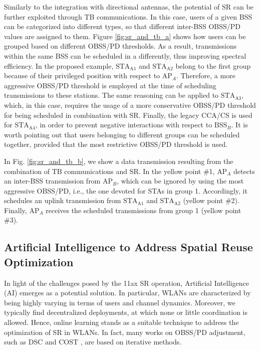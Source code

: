 \documentclass{article}
\begin{document}
Similarly to the integration with directional antennas, the potential of SR can be further exploited through TB communications. In this case, users of a given BSS can be categorized into different types, so that different inter-BSS OBSS/PD values are assigned to them. Figure \ref{fig:sr_and_tb_a} shows how users can be grouped based on different OBSS/PD thresholds. As a result, transmissions within the same BSS can be scheduled in a differently, thus improving spectral efficiency. In the proposed example, $\text{STA}_\text{A1}$ and $\text{STA}_\text{A2}$ belong to the first group because of their privileged position with respect to $\text{AP}_A$. Therefore, a more aggressive OBSS/PD threshold is employed at the time of scheduling transmissions to these stations. The same reasoning can be applied to $\text{STA}_\text{A3}$, which, in this case, requires the usage of a more conservative OBSS/PD threshold for being scheduled in combination with SR. Finally, the legacy CCA/CS is used for $\text{STA}_\text{A4}$, in order to prevent negative interactions with respect to $\text{BSS}_B$. It is worth pointing out that users belonging to different groups can be scheduled together, provided that the most restrictive OBSS/PD threshold is used. 

In Fig. \ref{fig:sr_and_tb_b}, we show a data transmission resulting from the combination of TB communications and SR. In the yellow point \#1, $\text{AP}_A$ detects an inter-BSS transmission from $\text{AP}_B$, which can be ignored by using the most aggressive OBSS/PD, i.e., the one devoted for STAs in group 1. Accordingly, it schedules an uplink transmission from $\text{STA}_\text{A1}$ and $\text{STA}_\text{A2}$ (yellow point \#2). Finally, $\text{AP}_A$ receives the scheduled transmissions from group 1 (yellow point \#3).

\subsection{Artificial Intelligence to Address Spatial Reuse Optimization}
In light of the challenges posed by the 11ax SR operation, Artificial Intelligence (AI) emerges as a potential solution. In particular, WLANs are characterized by being highly varying in terms of users and channel dynamics. Moreover, we typically find decentralized deployments, at which none or little coordination is allowed. Hence, online learning stands as a suitable technique to address the optimization of SR in WLANs. In fact, many works on OBSS/PD adjustment, such as DSC \cite{smith2015dynamic} and COST \cite{selinis2018control}, are based on iterative methods. 
\end{document}

